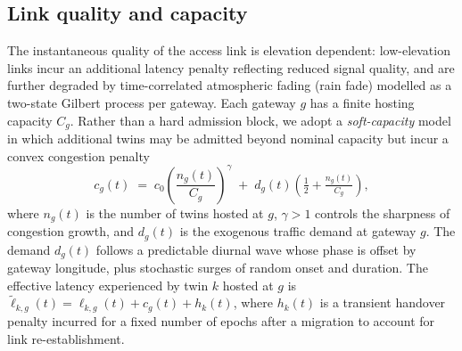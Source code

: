 \documentclass[11pt]{article}
\begin{document}
\subsection{Link quality and capacity}
The instantaneous quality of the access link is elevation dependent: low-elevation
links incur an additional latency penalty reflecting reduced signal quality, and
are further degraded by time-correlated atmospheric fading (rain fade) modelled as
a two-state Gilbert process per gateway. Each gateway $g$ has a finite hosting
capacity $C_g$. Rather than a hard admission block, we adopt a \emph{soft-capacity}
model in which additional twins may be admitted beyond nominal capacity but incur
a convex congestion penalty
\begin{equation}
  c_g(t) \;=\; c_0 \left( \frac{n_g(t)}{C_g} \right)^{\gamma}
  \;+\; d_g(t)\left(\tfrac{1}{2} + \tfrac{n_g(t)}{C_g}\right),
  \label{eq:congestion}
\end{equation}
where $n_g(t)$ is the number of twins hosted at $g$, $\gamma>1$ controls the
sharpness of congestion growth, and $d_g(t)$ is the exogenous traffic demand at
gateway $g$. The demand $d_g(t)$ follows a predictable diurnal wave whose phase is
offset by gateway longitude, plus stochastic surges of random onset and duration.
The effective latency experienced by twin $k$ hosted at $g$ is
$\tilde{\ell}_{k,g}(t) = \ell_{k,g}(t) + c_g(t) + h_k(t)$, where $h_k(t)$ is a
transient handover penalty incurred for a fixed number of epochs after a
migration to account for link re-establishment.
\end{document}
